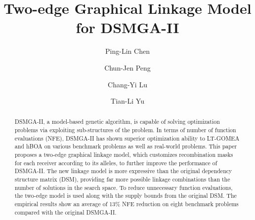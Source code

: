 \documentclass[sigconf]{acmart}
\begin{document}
\title{Two-edge Graphical Linkage Model for DSMGA-II}



\author{Ping-Lin Chen}

\author{Chun-Jen Peng}%

\author{Chang-Yi Lu}

\author{Tian-Li Yu}



\renewcommand{\shortauthors}{Chen et. al.}


\begin{abstract}

DSMGA-II, a model-based genetic algorithm, is capable of solving optimization problems via exploiting sub-structures of the problem. 
In terms of number of function evaluations (NFE), DSMGA-II has shown superior optimization ability to LT-GOMEA and hBOA on various benchmark problems as well as real-world problems. 
This paper proposes a two-edge graphical linkage model, which customizes recombination masks for each receiver according to its alleles, to further improve the performance of DSMGA-II.  
The new linkage model is more expressive than the original dependency structure matrix (DSM), providing far more possible linkage combinations than the number of solutions in the search space. 
To reduce unnecessary function evaluations, the two-edge model is used along with the supply bounds from the original DSM. 
The empirical results show an average of 13\% NFE reduction on eight benchmark problems compared with the original DSMGA-II.
\end{abstract}
\end{document}
